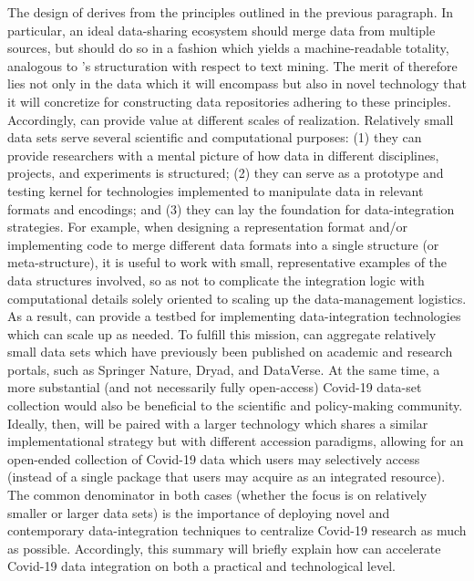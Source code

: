 \documentclass[11pt,letterpaper]{article}
\newcommand{\textscc}[1]{{\color{orr!35!black}{{%
						\fontfamily{Cabin-TLF}\fontseries{b}\selectfont{\textsc{\scriptsize{#1}}}}}}}
\newcommand{\AcronymText}[1]{{\textscc{#1}}}
\newcommand{\CRtwo}{{\resizebox{!}{7pt}{\AcronymText{CR2}}}}
\newcommand{\Cnineteen}{\resizebox{!}{7pt}{\AcronymText{CORD-19}}}
\newcommand{\p}[1]{

\vspace{.7em}#1}
\begin{document}
{%
\p{The design of \CRtwo{} derives from the principles outlined 
in the previous paragraph.  In particular, an ideal data-sharing 
ecosystem should merge data from multiple sources, but should do so 
in a fashion which yields a machine-readable totality, 
analogous to \Cnineteen{}'s structuration with respect to 
text mining.  The merit of \CRtwo{} therefore lies not 
only in the data which it will encompass but also in 
novel technology that it will concretize for constructing 
data repositories adhering to these principles.  
Accordingly, \CRtwo{} can provide value at different 
scales of realization.  Relatively small data 
sets serve several scientific and computational 
purposes: (1) they can provide researchers 
with a mental picture of how data in different 
disciplines, projects, and experiments is structured; 
(2) they can serve as a prototype and testing 
kernel for technologies implemented to manipulate 
data in relevant formats and encodings; and 
(3) they can lay the foundation for data-integration 
strategies.  For example, when designing a 
representation format and/or implementing code 
to merge different data formats into a single 
structure (or meta-structure), it is useful 
to work with small, representative examples 
of the data structures involved, so as not 
to complicate the integration logic with 
computational details solely oriented to 
scaling up the data-management logistics.  
As a result, \CRtwo{} can provide a 
testbed for implementing data-integration 
technologies which can scale up as needed.  
To fulfill this mission, \CRtwo{} can aggregate 
relatively small data sets which have 
previously been published on academic and research 
portals, such as Springer Nature, Dryad, and DataVerse.  
At the same time, a more substantial 
(and not necessarily fully open-access) Covid-19 
data-set collection would also be beneficial to the 
scientific and policy-making community.  Ideally, then, 
\CRtwo{} will be paired with a larger technology which shares 
a similar implementational strategy but with different 
accession paradigms, allowing for an open-ended 
collection of Covid-19 data which users may 
selectively access (instead of a single package 
that users may acquire as an integrated resource).  
The common denominator in both cases 
(whether the focus is on relatively smaller or 
larger data sets) is the 
importance of deploying novel and contemporary 
data-integration techniques to centralize 
Covid-19 research as much as possible.  
Accordingly, this summary will briefly explain 
how \CRtwo{} can accelerate Covid-19 data integration 
on both a practical and technological level.}
 
}
\end{document}
